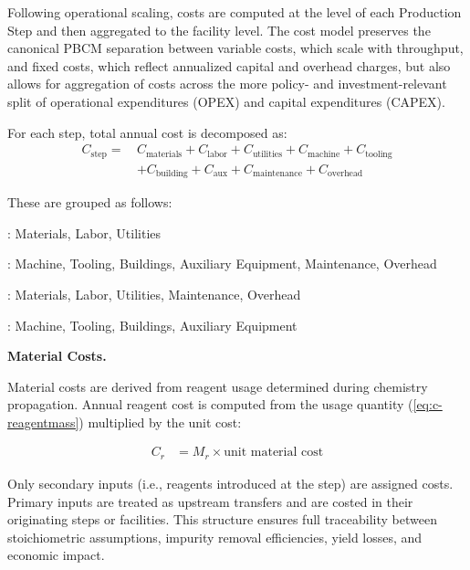Following operational scaling, costs are computed at the level of each Production Step and then aggregated to the facility level. The cost model preserves the canonical PBCM separation between variable costs, which scale with throughput, and fixed costs, which reflect annualized capital and overhead charges, but also allows for aggregation of costs across the more policy- and investment-relevant split of operational expenditures (OPEX) and capital expenditures (CAPEX).

For each step, total annual cost is decomposed as:
\begin{align}
    C_{\text{step}} = \, & C_{\text{materials}} + C_{\text{labor}} + C_{\text{utilities}} + 
    C_{\text{machine}} + C_{\text{tooling}} \nonumber \\
    & + C_{\text{building}} + C_{\text{aux}} + C_{\text{maintenance}} + C_{\text{overhead}}
\end{align}

These are grouped as follows:

\begin{description}[noitemsep, topsep=0pt]
    \item[\textbullet\enskip Variable]: Materials, Labor, Utilities
    \item[\textbullet\enskip Fixed]: Machine, Tooling, Buildings, Auxiliary Equipment, Maintenance, Overhead
    \item[\textbullet\enskip OPEX]: Materials, Labor, Utilities, Maintenance, Overhead
    \item[\textbullet\enskip CAPEX]: Machine, Tooling, Buildings, Auxiliary Equipment
\end{description}

\medskip
\noindent\textbf{Material Costs.}\quad

Material costs are derived from reagent usage determined during chemistry propagation. Annual reagent cost is computed from the usage quantity (\ref{eq:c-reagentmass}) multiplied by the unit cost:

\begin{align}
    C_r &= M_r \times \text{unit material cost}
\end{align}

Only secondary inputs (i.e., reagents introduced at the step) are assigned costs. Primary inputs are treated as upstream transfers and are costed in their originating steps or facilities. This structure ensures full traceability between stoichiometric assumptions, impurity removal efficiencies, yield losses, and economic impact.

